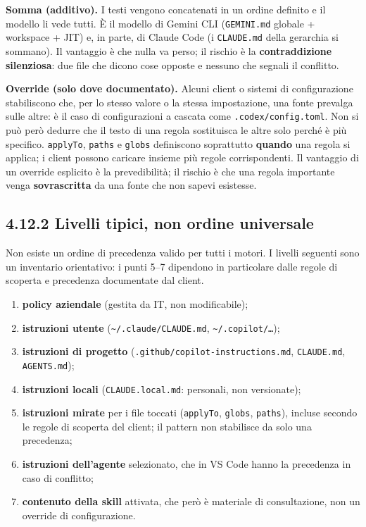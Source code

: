 \documentclass[
  italian,
  10pt,
]{book}
\providecommand{\tightlist}{%
  \setlength{\itemsep}{0pt}\setlength{\parskip}{0pt}}
\begin{document}
\textbf{Somma (additivo).} I testi vengono concatenati in un ordine
definito e il modello li vede tutti. È il modello di Gemini CLI
(\texttt{GEMINI.md} globale + workspace + JIT) e, in parte, di Claude
Code (i \texttt{CLAUDE.md} della gerarchia si sommano). Il vantaggio è
che nulla va perso; il rischio è la \textbf{contraddizione silenziosa}:
due file che dicono cose opposte e nessuno che segnali il conflitto.

\textbf{Override (solo dove documentato).} Alcuni client o sistemi di
configurazione stabiliscono che, per lo stesso valore o la stessa
impostazione, una fonte prevalga sulle altre: è il caso di
configurazioni a cascata come \texttt{.codex/config.toml}. Non si può
però dedurre che il testo di una regola sostituisca le altre solo perché
è più specifico. \texttt{applyTo}, \texttt{paths} e \texttt{globs}
definiscono soprattutto \textbf{quando} una regola si applica; i client
possono caricare insieme più regole corrispondenti. Il vantaggio di un
override esplicito è la prevedibilità; il rischio è che una regola
importante venga \textbf{sovrascritta} da una fonte che non sapevi
esistesse.

\subsection{4.12.2 Livelli tipici, non ordine
universale}\label{livelli-tipici-non-ordine-universale}

Non esiste un ordine di precedenza valido per tutti i motori. I livelli
seguenti sono un inventario orientativo: i punti 5--7 dipendono in
particolare dalle regole di scoperta e precedenza documentate dal
client.

\begin{enumerate}
\def\labelenumi{\arabic{enumi}.}
\tightlist
\item
  \textbf{policy aziendale} (gestita da IT, non modificabile);
\item
  \textbf{istruzioni utente}
  (\texttt{\textasciitilde{}/.claude/CLAUDE.md},
  \texttt{\textasciitilde{}/.copilot/…});
\item
  \textbf{istruzioni di progetto}
  (\texttt{.github/copilot-instructions.md}, \texttt{CLAUDE.md},
  \texttt{AGENTS.md});
\item
  \textbf{istruzioni locali} (\texttt{CLAUDE.local.md}: personali, non
  versionate);
\item
  \textbf{istruzioni mirate} per i file toccati (\texttt{applyTo},
  \texttt{globs}, \texttt{paths}), incluse secondo le regole di scoperta
  del client; il pattern non stabilisce da solo una precedenza;
\item
  \textbf{istruzioni dell'agente} selezionato, che in VS Code hanno la
  precedenza in caso di conflitto;
\item
  \textbf{contenuto della skill} attivata, che però è materiale di
  consultazione, non un override di configurazione.
\end{enumerate}
\end{document}
